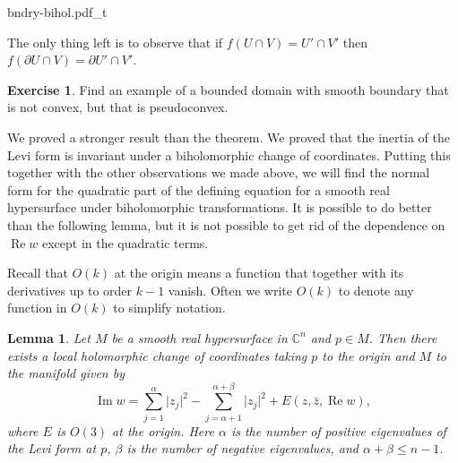 \documentclass[12pt,openany]{book}
\renewcommand{\Re}{\operatorname{Re}}
\renewcommand{\Im}{\operatorname{Im}}
\newcommand{\sabs}[1]{\lvert {#1} \rvert}
\newcommand{\C}{{\mathbb{C}}}
\newcommand{\myindex}[1]{#1\index{#1}}
\theoremstyle{plain}
\newtheorem{lemma}[thm]{Lemma}
\theoremstyle{remark}
\theoremstyle{definition}
\newenvironment{exbox}{%
    \def\FrameCommand{\vrule width 1pt \relax\hspace {10pt}}%
    \MakeFramed {\advance \hsize -\width \FrameRestore }%
}{%
    \endMakeFramed
}
\theoremstyle{exercise}
\newtheorem{exercise}{Exercise}[section]
\theoremstyle{example}
\begin{document}
\begin{center}
{bndry-bihol.pdf_t}
\end{center}

The only thing left is to observe that if
$f(U \cap V) = U' \cap V'$ then $f(\partial U \cap V) = \partial U' \cap
V'$.

\begin{exbox}
\begin{exercise}
Find an example of a bounded domain with smooth boundary that is not convex,
but that is pseudoconvex.
\end{exercise}
\end{exbox}

We proved a stronger result than the theorem.  We proved that the inertia
of the Levi form is invariant under a biholomorphic change of coordinates.
Putting this together with the other observations we made above,
we will find the normal form for the
quadratic part of the defining equation for a smooth real hypersurface
under biholomorphic transformations.
It is possible to do better than the following lemma, but it is not possible
to get rid of the dependence on $\Re w$ except in the quadratic
terms.

Recall that $O(k)$ at the origin means
a function that together with its derivatives up to order $k-1$ vanish.
Often we write
$O(k)$ to denote any function in $O(k)$ to simplify notation.

\begin{lemma} \label{lemma:normformquad}
Let $M$ be a smooth real hypersurface in $\C^n$ and $p \in M$.  Then there
exists a local holomorphic change of coordinates taking $p$ to the origin
and $M$ to the manifold given by
\begin{equation*}
\Im w = \sum_{j=1}^\alpha \sabs{z_j}^2 - \sum_{j=\alpha+1}^{\alpha+\beta}
\sabs{z_j}^2 +
E(z,\bar{z},\Re w) ,
\end{equation*}
where $E$ is $O(3)$ at the origin.
Here $\alpha$ is the number of positive eigenvalues of the Levi form at $p$,
$\beta$ is the number of negative eigenvalues, and $\alpha+\beta \leq
n-1$.
\end{lemma}

\end{document}
